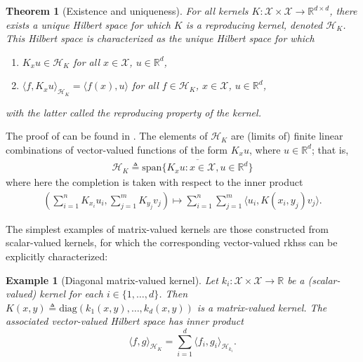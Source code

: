 \documentclass[12pt,paper=letter]{scrreprt}
\newtheorem{theorem}{Theorem}[chapter]
\newtheorem{example}{Example}[chapter]
\def\defeq{\triangleq} %
\begin{document}
\begin{theorem}[Existence and uniqueness]
\label{thm: existence vvrkhs}
For all kernels $K : \mathcal{X} \times \mathcal{X} \rightarrow \mathbb{R}^{d \times d}$, there exists a unique Hilbert space for which $K$ is a reproducing kernel, denoted $\mathcal{H}_K$.
This Hilbert space is characterized as the unique Hilbert space for which
\begin{enumerate}
    \item $K_x u \in \mathcal{H}_K$ for all $x \in \mathcal{X}$, $u \in \mathbb{R}^d$,
    \item $\langle f , K_x u \rangle_{\mathcal{H}_K} = \langle f(x) , u \rangle$ for all $f \in \mathcal{H}_K$, $x \in \mathcal{X}$, $u \in \mathbb{R}^d$,
\end{enumerate}
with the latter called the \emph{reproducing property} of the kernel.
\end{theorem}

\noindent The proof of  can be found in \citet[Proposition 2.1]{carmeli2006vector}.
The elements of $\mathcal{H}_K$ are (limits of) finite linear combinations of vector-valued functions of the form $K_x u$, where $u \in \mathbb{R}^d$; that is,
\begin{align*}
    \mathcal{H}_K \defeq \overline{\mathrm{span} \{ K_x u : x \in \mathcal{X}, u \in \mathbb{R}^d \} }
\end{align*}
where here the completion is taken with respect to the inner product 
\begin{align*}
    \left( \sum_{i=1}^n K_{x_i} u_i , \sum_{j=1}^m K_{y_j} v_j \right) \mapsto \sum_{i=1}^n \sum_{j=1}^m \langle u_i , K(x_i , y_j) v_j \rangle .
\end{align*}

The simplest examples of matrix-valued kernels are those constructed from scalar-valued kernels, for which the corresponding vector-valued \acp{rkhs} can be explicitly characterized:

\begin{example}[Diagonal matrix-valued kernel]
    Let $k_i : \mathcal{X} \times \mathcal{X} \rightarrow \mathbb{R}$ be a (scalar-valued) kernel for each $i \in \{1,\dots,d\}$.
    Then $K(x,y) \defeq  \mathrm{diag}(k_1(x,y),\dots,k_d(x,y))$ is a matrix-valued kernel.
    The associated vector-valued Hilbert space has inner product
    $$
    \langle f , g \rangle_{\mathcal{H}_K} = \sum_{i=1}^d \langle f_i , g_i \rangle_{\mathcal{H}_{k_i}}.
    $$
\end{example}
\end{document}
